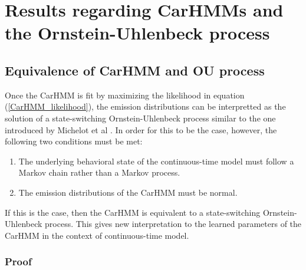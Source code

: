 
\section{Results regarding CarHMMs and the Ornstein-Uhlenbeck process}

\subsection{Equivalence of CarHMM and OU process}

Once the CarHMM is fit by maximizing the likelihood in equation (\ref{CarHMM_likelihood}), the emission distributions can be interpretted as the solution of a state-switching Ornstein-Uhlenbeck process similar to the one introduced by Michelot et al \cite{Michelot:2019}. In order for this to be the case, however, the following two conditions must be met:
\begin{enumerate}
	\item The underlying behavioral state of the continuous-time model must follow a Markov chain rather than a Markov process.
	\item The emission distributions of the CarHMM must be normal.
\end{enumerate}
If this is the case, then the CarHMM is equivalent to a state-switching Ornstein-Uhlenbeck process. This gives new interpretation to the learned parameters of the CarHMM in the context of continuous-time model.

\subsubsection{Proof}

